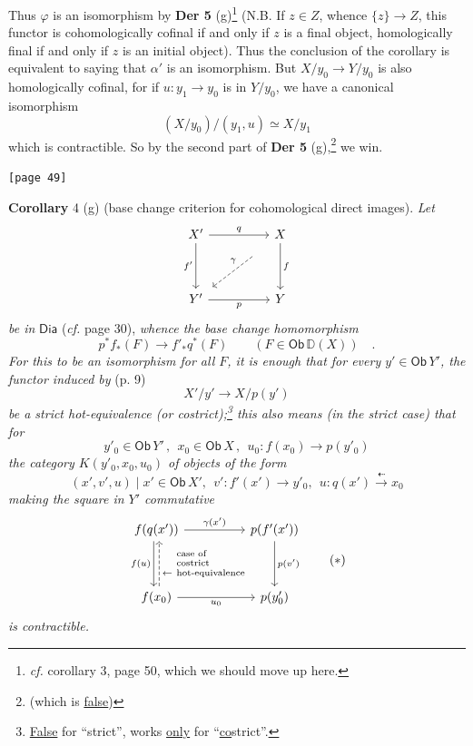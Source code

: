\documentclass[11pt]{article}
\newcommand{\printedpage}[1]{\marginpar{\footnotesize p.~#1}}
\newcommand{\msp}[1]{\marginpar{\footnotesize [#1]}}
\newcommand{\D}{\mathbb{D}}
\newcommand{\Dia}{\mathsf{Dia}}
\newcommand{\Ob}{\mathsf{Ob}}
\begin{document}
\printedpage{27}

\noindent Thus $\varphi$ is an isomorphism by \textbf{Der 5} (g)\footnote[17]{\textit{cf.} corollary 3, page 50, which we should move up here.} (N.B. If $z \in Z$, whence $\{z\} \to Z$, this functor is cohomologically cofinal if and only if $z$ is a final object, homologically final if and only if $z$ is an initial object). Thus the conclusion of the corollary is equivalent to saying that $\alpha'$ is an isomorphism. But $X/y_{0} \to Y/y_{0}$ is also homologically cofinal, for if $u : y_{1} \to y_{0}$ is in $Y/y_{0}$, we have a canonical isomorphism
\[ (X/y_{0})/(y_{1}, u) \simeq X/y_{1} \]
which is contractible. So by the second part of \textbf{Der 5} (g),\footnote[18]{(which is \underline{false})} we win.

\noindent\msp{page 49}\texttt{[page 49]}

\noindent\textbf{Corollary} 4 (g) (base change criterion for cohomological direct images). \textit{Let}
\[
\begin{tikzcd}[row sep=huge, column sep=huge]
X' \arrow[r, "q"] \arrow[d, "f'"'] & X \arrow[d, "f"] \arrow[dl, dashed, "\gamma"', shorten <=4ex, shorten >=1ex] \\
Y' \arrow[r, "p"'] & Y
\end{tikzcd}
\]
\textit{be in} $\Dia$ (\textit{cf.} page 30), \textit{whence the base change homomorphism}
\[ p^{*} f_{*}(F) \longrightarrow f'_{*} q^{*}(F) \qquad (F \in \Ob\,\D(X)) \quad . \]
\textit{For this to be an isomorphism for all $F$, it is enough that for every $y' \in \Ob\,Y'$, the functor induced by} (p. 9)
\[ X'/y' \longrightarrow X/p(y') \]
\textit{be a strict hot-equivalence (or costrict);\footnote[19]{\underline{False} for ``strict'', works \underline{only} for ``\underline{\underline{co}}strict''.} this also means (in the strict case) that for}
\[ y'_{0} \in \Ob\,Y' \,,\ \ x_{0} \in \Ob\,X \,,\ \ u_{0} : f(x_{0}) \longrightarrow p(y'_{0}) \]
\textit{the category $K(y'_{0}, x_{0}, u_{0})$ of objects of the form}
\[ (x', v', u) \mid x' \in \Ob\,X',\ \ v' : f'(x') \to y'_{0},\ \ u : q(x') \overset{\dashleftarrow}{\longrightarrow} x_{0} \]
\textit{making the square in $Y'$ commutative}
\[
\begin{tikzcd}[row sep=huge, column sep=huge]
f(q(x')) \arrow[r, "\gamma(x')"] \arrow[d, shift right=0.5ex, "f(u)"'] & p(f'(x')) \arrow[d, "p(v')"] \\
f(x_{0}) \arrow[r, "u_{0}"'] \arrow[u, dashed, shift right=0.5ex, "\leftarrow\ \text{\scriptsize\shortstack[l]{case of\\costrict\\hot-equivalence}}"'] & p(y'_{0})
\end{tikzcd}
\tag*{$(*)$}
\]
\textit{is contractible.}
\end{document}
